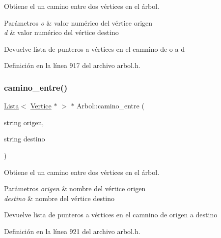 Obtiene el un camino entre dos vértices en el árbol. 


\begin{DoxyParams}{Parámetros}
{\em o} & valor numérico del vértice origen \\
\hline
{\em d} & valor numérico del vértice destino \\
\hline
\end{DoxyParams}
\begin{DoxyReturn}{Devuelve}
lista de punteros a vértices en el camnino de o a d 
\end{DoxyReturn}


Definición en la línea 917 del archivo arbol.\+h.

\mbox{\label{classArbol_aef0f680828ac573af495b98d2eb09c12}} 
\subsubsection{\texorpdfstring{camino\+\_\+entre()}{camino\_entre()}\hspace{0.1cm}{\footnotesize\ttfamily [2/2]}}
{\footnotesize\ttfamily \hyperlink{classLista}{Lista}$<$ \hyperlink{classVertice}{Vertice} $\ast$ $>$ $\ast$ Arbol\+::camino\+\_\+entre (\begin{DoxyParamCaption}\item[{string}]{origen,  }\item[{string}]{destino }\end{DoxyParamCaption})}



Obtiene el un camino entre dos vértices en el árbol. 


\begin{DoxyParams}{Parámetros}
{\em origen} & nombre del vértice origen \\
\hline
{\em destino} & nombre del vértice destino \\
\hline
\end{DoxyParams}
\begin{DoxyReturn}{Devuelve}
lista de punteros a vértices en el camnino de origen a destino 
\end{DoxyReturn}


Definición en la línea 921 del archivo arbol.\+h.

\mbox{\label{classArbol_aba59969b2a10294fb79e583a8e9471c5}} 
